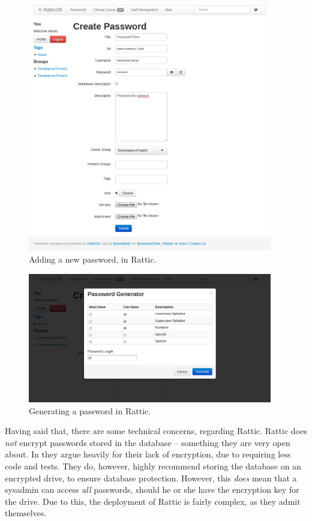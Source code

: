 			\begin{figure}[htbp]
				\centering
				\includegraphics[width=0.95\textwidth]{figures/analysis/rattic_newpassword_main.png}
				\caption{Adding a new password, in Rattic.}
				\label{fig:rattic_newpassword_main}
			\end{figure}

			\begin{figure}[htbp]
				\centering
				\includegraphics[width=0.95\textwidth]{figures/analysis/rattic_newpassword_passwordgen.png}
				\caption{Generating a password in Rattic.}
				\label{fig:rattic_newpassword_passwordgen}
			\end{figure}

			Having said that, there are some technical concerns, regarding Rattic. Rattic does \emph{not} encrypt passwords stored in the database -- something they are very open about. In \cite{rattic_encryption} they argue heavily for their lack of encryption, due to requiring less code and tests. They do, however, highly recommend storing the database on an encrypted drive, to ensure database protection. However, this \emph{does} mean that a sysadmin can access \emph{all} passwords, should he or she have the encryption key for the drive. Due to this, the deployment of Rattic is fairly complex, as they admit themselves. 


